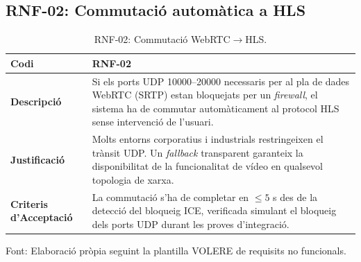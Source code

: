\subsection{RNF-02: Commutació automàtica a HLS}
\begin{table}[htbp]
  \centering
  \small
  \begin{tabular}{|l|p{10cm}|}
    \hline
    \textbf{Codi}                    & RNF-02 \\ \hline
    \textbf{Descripció}              & Si els ports UDP 10000--20000 necessaris per al pla de dades WebRTC (SRTP) estan bloquejats per un \textit{firewall}, el sistema ha de commutar automàticament al protocol HLS sense intervenció de l'usuari. \\ \hline
    \textbf{Justificació}            & Molts entorns corporatius i industrials restringeixen el trànsit UDP. Un \textit{fallback} transparent garanteix la disponibilitat de la funcionalitat de vídeo en qualsevol topologia de xarxa. \\ \hline
    \textbf{Criteris d'Acceptació}   & La commutació s'ha de completar en $\leq 5$ s des de la detecció del bloqueig ICE, verificada simulant el bloqueig dels ports UDP durant les proves d'integració. \\ \hline
  \end{tabular}
  \caption{RNF-02: Commutació WebRTC$\rightarrow$HLS.}
  \label{tab:rnf02}
\par\smallskip
\small Font: Elaboració pròpia seguint la plantilla VOLERE de requisits no funcionals.
\end{table}

\clearpage
